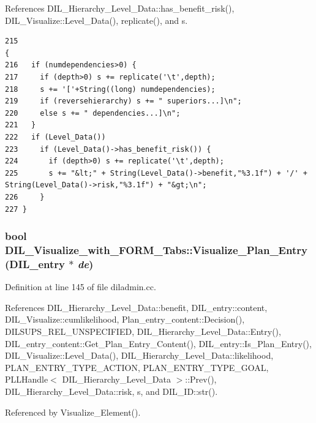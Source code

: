 References DIL\_\-Hierarchy\_\-Level\_\-Data::has\_\-benefit\_\-risk(), DIL\_\-Visualize::Level\_\-Data(), replicate(), and s.



\footnotesize\begin{verbatim}215                                                                                     {
216   if (numdependencies>0) {
217     if (depth>0) s += replicate('\t',depth);
218     s += '['+String((long) numdependencies);
219     if (reversehierarchy) s += " superiors...]\n";
220     else s += " dependencies...]\n";
221   }
222   if (Level_Data())
223     if (Level_Data()->has_benefit_risk()) {
224       if (depth>0) s += replicate('\t',depth);
225       s += "&lt;" + String(Level_Data()->benefit,"%3.1f") + '/' + String(Level_Data()->risk,"%3.1f") + "&gt;\n";
226     }
227 }
\end{verbatim}\normalsize 
{}
\subsubsection{\setlength{\rightskip}{0pt plus 5cm}bool DIL\_\-Visualize\_\-with\_\-FORM\_\-Tabs::Visualize\_\-Plan\_\-Entry ({\bf DIL\_\-entry} $\ast$ {\em de})\hspace{0.3cm}{\tt  [protected, virtual]}}\label{classDIL__Visualize__with__FORM__Tabs_b0}




Definition at line 145 of file diladmin.cc.

References DIL\_\-Hierarchy\_\-Level\_\-Data::benefit, DIL\_\-entry::content, DIL\_\-Visualize::cumlikelihood, Plan\_\-entry\_\-content::Decision(), DILSUPS\_\-REL\_\-UNSPECIFIED, DIL\_\-Hierarchy\_\-Level\_\-Data::Entry(), DIL\_\-entry\_\-content::Get\_\-Plan\_\-Entry\_\-Content(), DIL\_\-entry::Is\_\-Plan\_\-Entry(), DIL\_\-Visualize::Level\_\-Data(), DIL\_\-Hierarchy\_\-Level\_\-Data::likelihood, PLAN\_\-ENTRY\_\-TYPE\_\-ACTION, PLAN\_\-ENTRY\_\-TYPE\_\-GOAL, PLLHandle$<$ DIL\_\-Hierarchy\_\-Level\_\-Data $>$::Prev(), DIL\_\-Hierarchy\_\-Level\_\-Data::risk, s, and DIL\_\-ID::str().

Referenced by Visualize\_\-Element().



